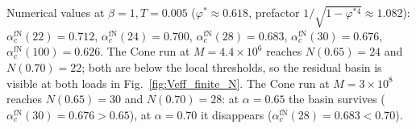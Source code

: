 \documentclass[letterpaper]{article} %
\newcommand{\Bnet}{\beta}
\newcommand{\ac}{\alpha_c}
\begin{document}
Numerical values at $\Bnet = 1, T = 0.005$ ($\varphi^* \approx 0.618$,
prefactor $1/\sqrt{1-\varphi^{*4}} \approx 1.082$):
$\ac^{\mathrm{fN}}(22) = 0.712$, $\ac^{\mathrm{fN}}(24) = 0.700$,
$\ac^{\mathrm{fN}}(28) = 0.683$, $\ac^{\mathrm{fN}}(30) = 0.676$,
$\ac^{\mathrm{fN}}(100) = 0.626$.  The Cone run at
$M = 4.4 \times 10^6$ reaches $N(0.65) = 24$ and $N(0.70) = 22$;
both are below the local thresholds, so the residual basin is
visible at both loads in Fig.~\ref{fig:Veff_finite_N}.  The Cone
run at $M = 3 \times 10^8$ reaches $N(0.65) = 30$ and
$N(0.70) = 28$: at $\alpha = 0.65$
the basin survives ($\ac^{\mathrm{fN}}(30) = 0.676 > 0.65$), at
$\alpha = 0.70$ it disappears ($\ac^{\mathrm{fN}}(28) = 0.683 < 0.70$).
\end{document}
